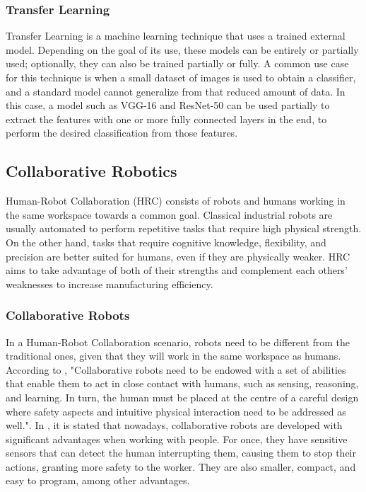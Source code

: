 \subsubsection{Transfer Learning}

Transfer Learning is a machine learning technique that uses a trained external model. Depending on the goal of its use, these models can be entirely or partially used; optionally, they can also be trained partially or fully. A common use case for this technique is when a small dataset of images is used to obtain a classifier, and a standard model cannot generalize from that reduced amount of data. In this case, a model such as VGG-16 and ResNet-50 can be used partially to extract the features with one or more fully connected layers in the end, to perform the desired classification from those features.

\subsection{Collaborative Robotics}
\label{subsection:collaborative_robotics}

Human-Robot Collaboration (HRC) consists of robots and humans working in the same workspace towards a common goal. Classical industrial robots are usually automated to perform repetitive tasks that require high physical strength. On the other hand, tasks that require cognitive knowledge, flexibility, and precision are better suited for humans, even if they are physically weaker. HRC aims to take advantage of both of their strengths and complement each others' weaknesses to increase manufacturing efficiency.

\subsubsection{Collaborative Robots}

In a Human-Robot Collaboration scenario, robots need to be different from the traditional ones, given that they will work in the same workspace as humans. According to \textcite{Castro2021}, "Collaborative robots need to be endowed with a set of abilities that enable them to act in close contact with humans, such as sensing, reasoning, and learning. In turn, the human must be placed at the centre of a careful design where safety aspects and intuitive physical interaction need to be addressed as well.". In \cite{CobotsWW}, it is stated that nowadays, collaborative robots are developed with significant advantages when working with people. For once, they have sensitive sensors that can detect the human interrupting them, causing them to stop their actions, granting more safety to the worker. They are also smaller, compact, and easy to program, among other advantages.

